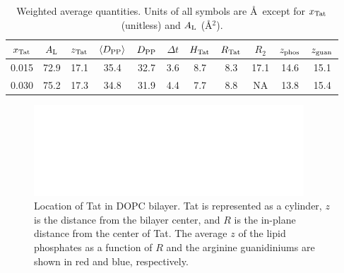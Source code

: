 \begin{table}[htbp]
  \centering
  \begin{tabular}{ccccccccccc}
    \hline
    \rule{0pt}{14pt} %
    $x_\textrm{Tat}$ & $A_\textrm{L}$ & $z_\textrm{Tat}$ & $\langle D_\textrm{PP}\rangle$ & $D_\textrm{PP}$ & $\Delta t$ & $H_\textrm{Tat}$ & $R_\textrm{Tat}$ & $R_2$ & $z_\textrm{phos}$ & $z_\textrm{guan}$ \\
    \hline    
    0.015 & 72.9 & 17.1 & 35.4 & 32.7 & 3.6 & 8.7 & 8.3 & 17.1 & 14.6 & 15.1 \\  
    0.030 & 75.2 & 17.3 & 34.8 & 31.9 & 4.4 & 7.7 & 8.8 & NA & 13.8 & 15.4 \\
    \hline
  \end{tabular}
  \caption{Weighted average quantities.
  Units of all symbols are \AA\ except for $x_\textrm{Tat}$ (unitless)
  and $A_\textrm{L}$ (\AA$^2$).}
  \label{tab:MD_summary}
\end{table}

\begin{figure}[htbp]
  \centering
  \includegraphics[width=0.9\textwidth]{figures/Tat/figure9}
  \caption{Location of Tat in DOPC bilayer. Tat is represented as a cylinder, $z$ is the distance
  from the bilayer center, and $R$ is the in-plane distance from the center of Tat. The average $z$ of
  the lipid phosphates as a function of $R$ and the arginine guanidiniums are shown in red and blue,
  respectively.}
  \label{fig:figure9}
\end{figure}



